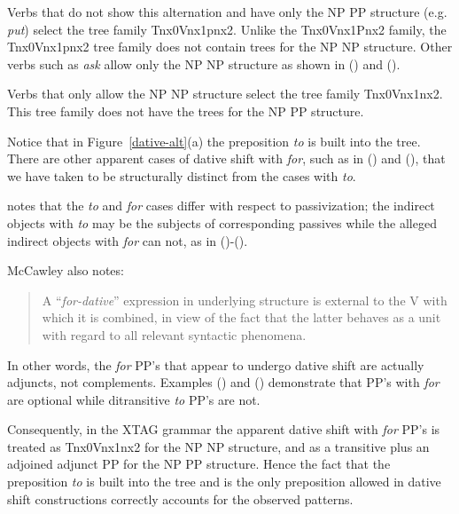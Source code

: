 Verbs that do not show this alternation and have only the NP PP structure
(e.g. {\it put\/}) select the tree family Tnx0Vnx1pnx2.  Unlike the
Tnx0Vnx1Pnx2 family, the Tnx0Vnx1pnx2 tree family does not contain trees for
the NP NP structure. Other verbs such as {\it ask} allow only the NP NP
structure as shown in () and ().


Verbs that only allow the NP NP structure select the tree family
Tnx0Vnx1nx2. This tree family does not have the trees for the NP PP
structure. 

Notice that in Figure~\ref{dative-alt}(a) the preposition {\it to\/} is
built into the tree.  There are other apparent cases of dative shift
with {\it for}, such as in () and (), that we have taken to
be structurally distinct from the cases with {\it to}.  


\cite{mccawley88} notes that the {\it to} and {\it for} cases
differ with respect to passivization; the indirect objects with {\it
to} may be the subjects of corresponding passives while the alleged
indirect objects with {\it for} can not, as in ()-().


McCawley also notes:

\begin{quote}
A ``{\it for-dative}'' expression in underlying structure is external
to the V with which it is combined, in view of the fact that the
latter behaves as a unit with regard to all relevant syntactic
phenomena.
\end{quote}


In other words, the {\it for} PP's that appear to undergo dative shift are
actually adjuncts, not complements. Examples () and () demonstrate
that PP's with {\it for} are optional while ditransitive {\it to} PP's are not.


Consequently, in the XTAG grammar the apparent dative shift with {\it
for} PP's is treated as Tnx0Vnx1nx2 for the NP NP structure, and as a
transitive plus an adjoined adjunct PP for the NP PP structure.  Hence
the fact that the preposition {\it to} is built into the tree and is
the only preposition allowed in dative shift constructions correctly
accounts for the observed patterns.

